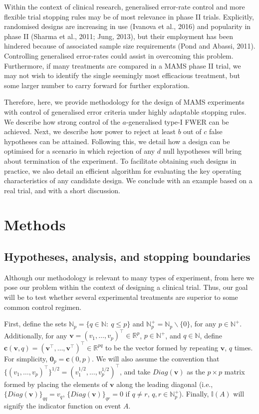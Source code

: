 \documentclass{article}
\numberwithin{equation}{section}
\theoremstyle{plain}
\begin{document}
Within the context of clinical research, generalised error-rate control and more flexible trial stopping rules may be of most relevance in phase II trials. Explicitly, randomised designs are increasing in use (Ivanova et al., 2016) and popularity in phase II (Sharma et al., 2011; Jung, 2013), but their employment has been hindered because of associated sample size requirements (Pond and Abassi, 2011). Controlling generalised error-rates could assist in overcoming this problem. Furthermore, if many treatments are compared in a MAMS phase II trial, we may not wish to identify the single seemingly most efficacious treatment, but some larger number to carry forward for further exploration.

Therefore, here, we provide methodology for the design of MAMS experiments with control of generalised error criteria under highly adaptable stopping rules. We describe how strong control of the $a$-generalised type-I FWER can be achieved. Next, we describe how power to reject at least $b$ out of $c$ false hypotheses can be attained. Following this, we detail how a design can be optimised for a scenario in which rejection of any $d$ null hypotheses will bring about termination of the experiment. To facilitate obtaining such designs in practice, we also detail an efficient algorithm for evaluating the key operating characteristics of any candidate design. We conclude with an example based on a real trial, and with a short discussion.

\section{Methods} \label{s:model}

\subsection{Hypotheses, analysis, and stopping boundaries}

Although our methodology is relevant to many types of experiment, from here we pose our problem within the context of designing a clinical trial. Thus, our goal will be to test whether several experimental treatments are superior to some common control regimen.

First, define the sets $\mathbb{N}_p=\{q\in\mathbb{N} : \ q \le p\}$ and $\mathbb{N}_p^+=\mathbb{N}_p\backslash\{0\}$, for any $p\in\mathbb{N}^+$. Additionally, for any $\boldsymbol{v}=(v_1,\dots,v_p)^\top\in\mathbb{R}^p$, $p\in\mathbb{N}^+$, and $q\in\mathbb{N}$, define $\boldsymbol{c}(\boldsymbol{v},q)=(\boldsymbol{v}^\top,\dots,\boldsymbol{v}^\top)^\top\in\mathbb{R}^{pq}$ to be the vector formed by repeating $\boldsymbol{v}$, $q$ times. For simplicity, $\boldsymbol{0}_p=\boldsymbol{c}(0, p)$. We will also assume the convention that $\{(v_1,\dots,v_p)^\top\}^{1/2}=(v_1^{1/2},\dots,v_p^{1/2})^\top$, and take $Diag(\boldsymbol{v})$ as the $p\times p$ matrix formed by placing the elements of $\boldsymbol{v}$ along the leading diagonal (i.e., $\{Diag(\boldsymbol{v})\}_{qq}=v_q$, $\{Diag(\boldsymbol{v})\}_{qr}=0$ if $q\neq r$, $q,r\in\mathbb{N}_p^+$). Finally, $\mathbb{I}(A)$ will signify the indicator function on event $A$.
\end{document}
